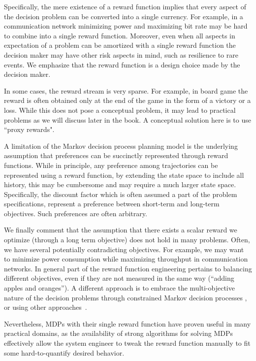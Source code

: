 Specifically, the mere existence of a reward function implies that every aspect of the decision problem can be converted into a single currency. For example, in a communication network minimizing power and maximizing bit rate may be hard to combine into a single reward function. 
Moreover, even when  all aspects in expectation of a problem can be amortized with a single reward function the decision maker may have other risk aspects in mind, such as resilience to rare events. 
We emphasize that the reward function is a design choice made by the decision maker.

In some cases, the reward stream is very sparse. For example, in board game the reward is often obtained only at the end of the game in the form of a victory or a loss. While this does not pose a conceptual problem, it may lead to practical problems as we will discuss later in the book. A conceptual solution here is to use ``proxy rewards".

A limitation of the Markov decision process planning model is
the underlying assumption that preferences can be succinctly represented through reward functions. While in principle, any preference among trajectories can be 
represented using a reward function, by extending the state space to include all history, this may be cumbersome and may require a much larger state space. Specifically, the discount factor which is often assumed a part of the problem specifications, represent a preference between short-term and long-term objectives. Such preferences are often arbitrary.

We finally comment that the assumption that there exists a scalar reward we optimize (through a long term objective) does not hold in many problems. Often, we have several potentially contradicting objectives. For example, we may want to minimize power consumption while maximizing throughput in communication networks. In general part of the reward function engineering pertains to balancing different objectives, even if they are not measured in the same way (``adding apples and oranges''). A different approach is to embrace the multi-objective nature of the decision problems through constrained Markov decision processes \cite{altman2021constrained}, or using other approaches~\cite[e.g.,][]{mannor2004geometric}. 

Nevertheless, MDPs with their single reward function have proven useful in many practical domains, as the availability of strong algorithms for solving MDPs effectively allow the system engineer to tweak the reward function manually to fit some hard-to-quantify desired behavior.

